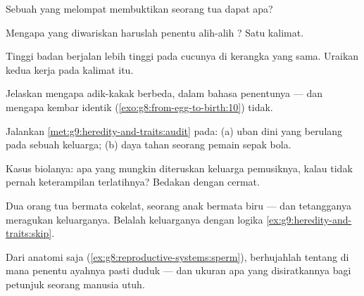 \begin{exercise}[$\star$]\label{exo:g9:heredity-and-traits:5}
Sebuah  yang melompat membuktikan seorang tua dapat apa?
\end{exercise}

\begin{exercise}[$\star$]\label{exo:g9:heredity-and-traits:6}
Mengapa yang diwariskan haruslah penentu alih-alih ?
Satu kalimat.
\end{exercise}

\begin{exercise}[$\star\star$]\label{exo:g9:heredity-and-traits:7}
Tinggi badan berjalan lebih tinggi pada cucunya di kerangka
yang sama. Uraikan kedua kerja pada kalimat itu.
\end{exercise}

\begin{exercise}[$\star\star$]\label{exo:g9:heredity-and-traits:8}
Jelaskan mengapa adik-kakak berbeda, dalam bahasa
penentunya --- dan mengapa kembar identik
(\cref{exo:g8:from-egg-to-birth:10}) tidak.
\end{exercise}

\begin{exercise}[$\star\star$]\label{exo:g9:heredity-and-traits:9}
Jalankan \cref{met:g9:heredity-and-traits:audit} pada: (a)
uban dini yang berulang pada sebuah keluarga; (b) daya tahan
seorang pemain sepak bola.
\end{exercise}

\begin{exercise}[$\star\star$]\label{exo:g9:heredity-and-traits:10}
Kasus biolanya: apa yang mungkin diteruskan keluarga
pemusiknya, kalau tidak pernah keterampilan terlatihnya?
Bedakan dengan cermat.
\end{exercise}

\begin{exercise}[$\star\star$]\label{exo:g9:heredity-and-traits:11}
Dua orang tua bermata cokelat, seorang anak bermata biru ---
dan tetangganya meragukan keluarganya. Belalah keluarganya
dengan logika \cref{ex:g9:heredity-and-traits:skip}.
\end{exercise}

\begin{exercise}[$\star\star\star$]\label{exo:g9:heredity-and-traits:12}
Dari anatomi  saja
(\cref{ex:g8:reproductive-systems:sperm}), berhujahlah
tentang di mana penentu ayahnya pasti duduk --- dan ukuran
apa yang disiratkannya bagi petunjuk seorang manusia utuh.
\end{exercise}


